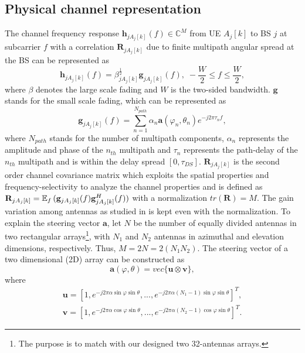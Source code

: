 \subsection{Physical channel representation}
The channel frequency response $\mathbf{h}_{jA_j[k]}(f)\in\mathbb{C}^{M}$ from UE $A_j[k]$ to BS $j$ at subcarrier $f$ with a correlation $\mathbf{R}_{jA_{j}[k]}$ due to finite multipath angular spread at the BS  can be represented as
\begin{equation}
\mathbf{h}_{jA_{j}[k]}(f)=\beta^{\frac{1}{2}}_{jA_{j}[k]}\mathbf{g}_{jA_{j}[k]}(f),\;-\frac{W}{2}\leq f\leq \frac{W}{2},
\end{equation}
where $\beta$ denotes the large scale fading and $W$ is the two-sided bandwidth. $\mathbf{g}$ stands for the small scale fading, which can be represented as
\begin{equation}
 \mathbf{g}_{jA_{j}[k]}(f)=\sum_{n=1}^{N_{path}}\alpha_{n}\mathbf{a}(\varphi_n,\theta_n)e^{-j2\pi\tau_{n}f},
\end{equation}
where $N_{path}$ %
stands for the number of multipath components, $\alpha_n$  %
represents the amplitude and phase of the $n_{th}$ multipath and $\tau_n$ represents the path-delay of the $n_{th}$ multipath and is within the delay spread $[0,\tau_{DS}]$. 
$\mathbf{R}_{jA_{j}[k]}$ is the second order channel covariance matrix which exploits the spatial properties and frequency-selectivity to analyze the channel properties and is defined as $\mathbf{R}_{jA_j[k]}=\operatorname{\mathbb{E}}_f{({\mathbf{g}}_{jA_j[k]}(f){\mathbf{g}}_{jA_j[k]}^H(f))}$ with a normalization $tr(\mathbf{R})=M$. The gain variation among antennas as studied in\cite{chen2017finite} is kept even with the normalization. To explain the steering vector $\mathbf{a}$, let $N$ be the number of equally divided antennas in two rectangular arrays\footnote{The purpose is to match with our designed two 32-antennas arrays.}, with $N_1$ and $N_2$ antennas in azimuthal and elevation dimensions, respectively. Thus, $M=2N=2(N_1N_2)$. The  steering vector of a two dimensional (2D) array can be constructed as
\begin{equation}
\mathbf{a}(\varphi,\theta)=vec\big\{\mathbf{u}\otimes\mathbf{v}\big\},
\label{eq:steervector}
\end{equation}
where
\begin{equation}
\begin{split}
\mathbf{u}=[1,e^{-j2\pi \alpha\sin\varphi\sin\theta},...,e^{-j2\pi \alpha (N_1-1)\sin\varphi\sin\theta}]^T, \\
\mathbf{v}=[1,e^{-j2\pi \alpha\cos\varphi\sin\theta},...,e^{-j2\pi \alpha(N_2-1)\cos\varphi\sin\theta}]^T.
\end{split}
\end{equation}

